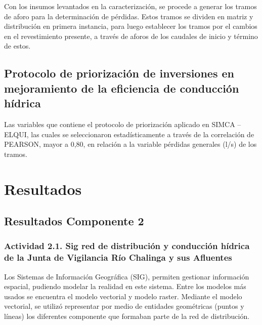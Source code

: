 \documentclass[]{article}
\begin{document}
Con los insumos levantados en la caracterización, se procede a generar los tramos de aforo para la determinación de pérdidas. Estos tramos se dividen en matriz y distribución en primera instancia, para luego establecer los tramos por el cambios en el revestimiento presente, a través de aforos de los caudales de inicio y término de estos.







\subsection{Protocolo de priorización de inversiones en mejoramiento de la eficiencia de conducción hídrica}

Las variables que contiene el protocolo de priorización aplicado en SIMCA – ELQUI, las cuales se seleccionaron estadísticamente a través de la correlación de PEARSON, mayor a 0,80, en relación a la variable pérdidas generales (l/s) de los tramos.

\clearpage
\section{Resultados}

\subsection{Resultados Componente 2}
\subsubsection{Actividad 2.1. Sig red de distribución y conducción hídrica de la Junta de Vigilancia Río Chalinga y sus Afluentes }

Los Sistemas de Información Geográfica (SIG), permiten gestionar información espacial, pudiendo modelar la realidad en este sistema. Entre los modelos más usados se encuentra el modelo vectorial y modelo raster. Mediante el modelo vectorial, se utilizó representar por medio de entidades geométricas (puntos y líneas) los diferentes componente que formaban parte de la red de distribución.
\end{document}
